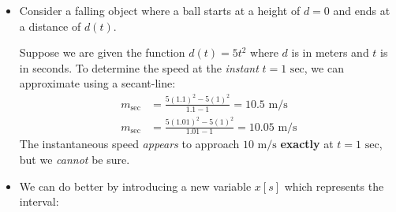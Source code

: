 \begin{itemize}
    \item Consider a falling object where a ball starts at a height of $d=0$ and ends at a distance of $d(t)$.
    \begin{center}
    \end{center}
    Suppose we are given the function $d(t)=5t^2$ where $d$ is in meters and $t$ is in seconds.
    To determine the speed at the \emph{instant} $t=1 \text{ sec}$, we can approximate using a secant-line:
    \begin{align}
        m_\text{sec} &= \frac{5(1.1)^2-5(1)^2}{1.1-1}=10.5 \text{ m/s} \\ 
        m_\text{sec} &= \frac{5(1.01)^2-5(1)^2}{1.01-1}=10.05 \text{ m/s} 
        \label{eq:}
    \end{align}
    The instantaneous speed \textit{appears} to approach $10 \text{ m/s}$ \textbf{exactly} at $t=1 \text{ sec}$, but we \emph{cannot} be sure. \item We can do better by introducing a new variable $x[s]$ which represents the interval:
    \begin{center}
\end{center}
\end{itemize}
